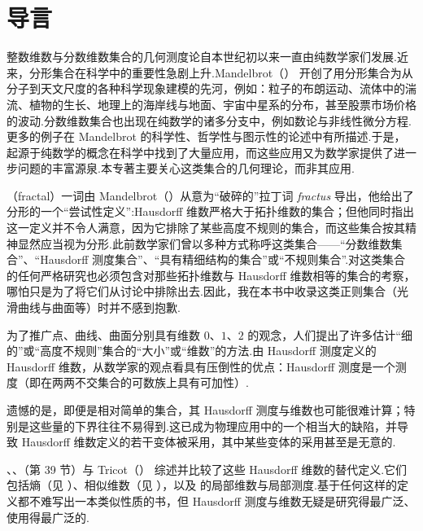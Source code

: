 
\chapter*{导言}

整数维数与分数维数集合的几何测度论自本世纪初以来一直由纯数学家们发展.近来，分形集合在科学中的重要性急剧上升.Mandelbrot（\citeyear{mandelbrot1975,mandelbrot1977,mandelbrot1982}） 开创了用分形集合为从分子到天文尺度的各种科学现象建模的先河，例如：粒子的布朗运动、流体中的湍流、植物的生长、地理上的海岸线与地面、宇宙中星系的分布，甚至股票市场价格的波动.分数维数集合也出现在纯数学的诸多分支中，例如数论与非线性微分方程.更多的例子在 Mandelbrot 的科学性、哲学性与图示性的论述中有所描述.于是，起源于纯数学的概念在科学中找到了大量应用，而这些应用又为数学家提供了进一步问题的丰富源泉.本专著主要关心这类集合的几何理论，而非其应用.

（fractal）一词由 Mandelbrot（\citeyear{mandelbrot1975}）从意为``破碎的''拉丁词 \emph{fractus} 导出，他给出了分形的一个``尝试性定义'':Hausdorff 维数严格大于拓扑维数的集合；但他同时指出这一定义并不令人满意，因为它排除了某些高度不规则的集合，而这些集合按其精神显然应当视为分形.此前数学家们曾以多种方式称呼这类集合——``分数维数集合''、``Hausdorff 测度集合''、``具有精细结构的集合''或``不规则集合''.对这类集合的任何严格研究也必须包含对那些拓扑维数与 Hausdorff 维数相等的集合的考察，哪怕只是为了将它们从讨论中排除出去.因此，我在本书中收录这类正则集合（光滑曲线与曲面等）时并不感到抱歉.

为了推广点、曲线、曲面分别具有维数 $0$、$1$、$2$ 的观念，人们提出了许多估计``细的''或``高度不规则''集合的``大小''或``维数''的方法.由 Hausdorff 测度定义的 Hausdorff 维数，从数学家的观点看具有压倒性的优点：Hausdorff 测度是一个测度（即在两两不交集合的可数族上具有可加性）.

遗憾的是，即便是相对简单的集合，其 Hausdorff 测度与维数也可能很难计算；特别是这些量的下界往往不易得到.这已成为物理应用中的一个相当大的缺陷，并导致 Hausdorff 维数定义的若干变体被采用，其中某些变体的采用甚至是无意的.

\textcite{hurewiczwallman1941}、\textcite{kahane1976}、\textcite{mandelbrot1982}（第 39 节）与 Tricot（\citeyear{tricot1981,tricot1982}） 综述并比较了这些 Hausdorff 维数的替代定义.它们包括熵（见 \textcite{hawkes1974}）、相似维数（见 \textcite{mandelbrot1982}），以及 \textcite{johnsonrogers1982} 的局部维数与局部测度.基于任何这样的定义都不难写出一本类似性质的书，但 Hausdorff 测度与维数无疑是研究得最广泛、使用得最广泛的.

